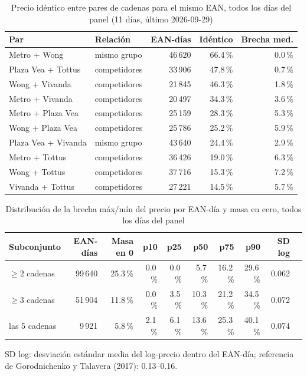 
\begin{table}[htbp]
\caption{Precio id\'entico entre pares de cadenas para el mismo EAN, todos los d\'ias del panel (11 d\'ias, \'ultimo 2026-09-29)}
\label{tab:identidad}
\centering\scriptsize\setlength{\tabcolsep}{3pt}
\begin{tabular}{@{}llrrr@{}}
\toprule
Par & Relaci\'on & EAN-d\'ias & Id\'entico & Brecha med. \\
\midrule
Metro + Wong & mismo grupo & 46\,620 & 66.4\,\% & 0.0\,\% \\
Plaza Vea + Tottus & competidores & 33\,906 & 47.8\,\% & 0.7\,\% \\
Wong + Vivanda & competidores & 21\,845 & 46.3\,\% & 1.8\,\% \\
Metro + Vivanda & competidores & 20\,497 & 34.3\,\% & 3.6\,\% \\
Metro + Plaza Vea & competidores & 25\,159 & 28.3\,\% & 5.3\,\% \\
Wong + Plaza Vea & competidores & 25\,786 & 25.2\,\% & 5.9\,\% \\
Plaza Vea + Vivanda & mismo grupo & 43\,640 & 24.4\,\% & 2.9\,\% \\
Metro + Tottus & competidores & 36\,426 & 19.0\,\% & 6.3\,\% \\
Wong + Tottus & competidores & 37\,716 & 15.3\,\% & 7.2\,\% \\
Vivanda + Tottus & competidores & 27\,221 & 14.5\,\% & 5.7\,\% \\
\bottomrule\end{tabular}\end{table}

\begin{table}[t]
\caption{Distribuci\'on de la brecha m\'ax/m\'in del precio por EAN-d\'ia y masa en cero, todos los d\'ias del panel}
\label{tab:brecha}
\centering\scriptsize\setlength{\tabcolsep}{4pt}
\begin{tabular}{@{}lrrrrrrrrr@{}}
\toprule
Subconjunto & EAN-d\'ias & Masa en 0 & p10 & p25 & p50 & p75 & p90 & SD log \\
\midrule
$\geq 2$ cadenas & 99\,640 & 25.3\,\% & 0.0\,\% & 0.0\,\% & 5.7\,\% & 16.2\,\% & 29.6\,\% & 0.062 \\
$\geq 3$ cadenas & 51\,904 & 11.8\,\% & 0.0\,\% & 3.5\,\% & 10.3\,\% & 21.2\,\% & 34.5\,\% & 0.072 \\
las 5 cadenas & 9\,921 & 5.8\,\% & 2.1\,\% & 6.1\,\% & 13.6\,\% & 25.3\,\% & 40.1\,\% & 0.074 \\
\bottomrule\end{tabular}
\par\smallskip\raggedright\scriptsize SD log: desviaci\'on est\'andar media del log-precio dentro del EAN-d\'ia; referencia de Gorodnichenko y Talavera (2017): 0.13--0.16.
\end{table}

